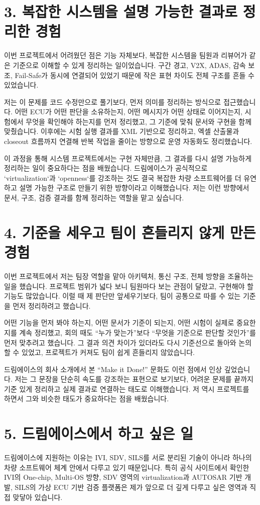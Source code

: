 \documentclass[11pt]{article}
\begin{document}
\section*{3. 복잡한 시스템을 설명 가능한 결과로 정리한 경험}
이번 프로젝트에서 어려웠던 점은 기능 자체보다, 복잡한 시스템을 팀원과 리뷰어가 같은 기준으로 이해할 수 있게 정리하는 일이었습니다. 구간 경고, V2X, ADAS, 감속 보조, Fail-Safe가 동시에 연결되어 있었기 때문에 작은 표현 차이도 전체 구조를 흔들 수 있었습니다.

저는 이 문제를 코드 수정만으로 풀기보다, 먼저 의미를 정리하는 방식으로 접근했습니다. 어떤 ECU가 어떤 판단을 소유하는지, 어떤 메시지가 어떤 상태로 이어지는지, 시험에서 무엇을 확인해야 하는지를 먼저 정리했고, 그 기준에 맞춰 문서와 구현을 함께 맞췄습니다. 이후에는 시험 실행 결과를 XML 기반으로 정리하고, 엑셀 산출물과 closeout 흐름까지 연결해 반복 작업을 줄이는 방향으로 운영 자동화도 정리했습니다.

이 과정을 통해 시스템 프로젝트에서는 구현 자체만큼, 그 결과를 다시 설명 가능하게 정리하는 일이 중요하다는 점을 배웠습니다. 드림에이스가 공식적으로 `virtualization`과 `openness`를 강조하는 것도 결국 복잡한 차량 소프트웨어를 더 유연하고 설명 가능한 구조로 만들기 위한 방향이라고 이해했습니다. 저는 이런 방향에서 문서, 구조, 검증 결과를 함께 정리하는 역할을 맡고 싶습니다.

\section*{4. 기준을 세우고 팀이 흔들리지 않게 만든 경험}
이번 프로젝트에서 저는 팀장 역할을 맡아 아키텍처, 통신 구조, 전체 방향을 조율하는 일을 했습니다. 프로젝트 범위가 넓다 보니 팀원마다 보는 관점이 달랐고, 구현해야 할 기능도 많았습니다. 이럴 때 제 판단만 앞세우기보다, 팀이 공통으로 따를 수 있는 기준을 먼저 정리하려고 했습니다.

어떤 기능을 먼저 봐야 하는지, 어떤 문서가 기준이 되는지, 어떤 시험이 실제로 중요한지를 계속 정리했고, 회의 때도 ``누가 맞는가''보다 ``무엇을 기준으로 판단할 것인가''를 먼저 맞추려고 했습니다. 그 결과 의견 차이가 있더라도 다시 기준선으로 돌아와 논의할 수 있었고, 프로젝트가 커져도 팀이 쉽게 흔들리지 않았습니다.

드림에이스의 회사 소개에서 본 ``Make it Done!'' 문화도 이런 점에서 인상 깊었습니다. 저는 그 문장을 단순히 속도를 강조하는 표현으로 보기보다, 어려운 문제를 끝까지 기준 있게 정리하고 실제 결과로 연결하는 태도로 이해했습니다. 저 역시 프로젝트를 하면서 그와 비슷한 태도가 중요하다는 점을 배웠습니다.

\section*{5. 드림에이스에서 하고 싶은 일}
드림에이스에 지원하는 이유는 IVI, SDV, SILS를 서로 분리된 기술이 아니라 하나의 차량 소프트웨어 체계 안에서 다루고 있기 때문입니다. 특히 공식 사이트에서 확인한 IVI의 One-chip, Multi-OS 방향, SDV 영역의 virtualization과 AUTOSAR 기반 개발, SILS의 가상 ECU 기반 검증 플랫폼은 제가 앞으로 더 깊게 다루고 싶은 영역과 직접 맞닿아 있습니다.
\end{document}
